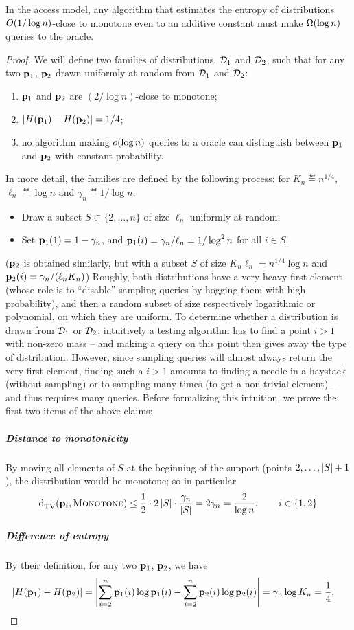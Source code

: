 \begin{theorem}\label{theorem:entropy:estimation:additive:monotone:lb:pdf}
In the \pdfsamp access model, any algorithm that estimates the entropy of distributions $\bigO{1/\log n}$-close to monotone even to an additive constant must make $\bigOmega{\log n}$ queries to the oracle.
\end{theorem}
\begin{proof}
We will define two families of distributions, $\mathcal{D}_1$ and $\mathcal{D}_2$, such that for any two $\mathbf{p}_1$, $\mathbf{p}_2$ drawn uniformly at random from $\mathcal{D}_1$ and $\mathcal{D}_2$:
\begin{enumerate}
  \item $\mathbf{p}_1$ and $\mathbf{p}_2$ are $(2/\log n)$-close to monotone;
  \item $\left\lvert H(\mathbf{p}_1)-H(\mathbf{p}_2) \right\rvert = 1/4$;
  \item no algorithm making $\littleO{\log n}$ queries to a \pdfsamp oracle can distinguish between $\mathbf{p}_1$ and $\mathbf{p}_2$ with constant probability.
\end{enumerate}
In more detail, the families are defined by the following process: for $K_n\eqdef n^{1/4}$, $\ell_n\eqdef\log n$ and $\gamma_n\eqdef 1/\log n$,
\begin{itemize}
  \item Draw a subset $S\subset\{2,\dots,n\}$ of size $\ell_n$ uniformly at random;
  \item Set $\mathbf{p}_1(1)=1-\gamma_n$, and $\mathbf{p}_1(i)=\gamma_n/\ell_n=1/\log^2 n$ for all $i\in S$.
\end{itemize}
($\mathbf{p}_2$ is obtained similarly, but with a subset $S$ of size $K_n\ell_n= n^{1/4}\log n$ and $\mathbf{p}_2(i)=\gamma_n/(\ell_n K_n)$)
Roughly, both distributions have a very heavy first element (whose role is to ``disable'' sampling queries by hogging them with high probability), and then a random subset of size respectively logarithmic or polynomial, on which they are uniform. To determine whether a distribution is drawn from $\mathcal{D}_1$ or $\mathcal{D}_2$, intuitively a testing algorithm has to find a point $i > 1$ with non-zero mass -- and making a query on this point then gives away the type of distribution. However, since sampling queries will almost always return the very first element, finding such a $i > 1$ amounts to finding a needle in a haystack (without sampling) or to sampling many times (to get a non-trivial element) -- and thus requires many queries. Before formalizing this intuition, we prove the first two items of the above claims:
\subparagraph{Distance to monotonicity} By moving all elements of $S$ at the beginning of the support (points $2,\dots,\left\lvert S \right\rvert+1$), the distribution would be monotone; so in particular
\[
  {\operatorname{d}_{\textrm{TV}}^{}\!\left({\mathbf{p}_i, \textsc{Monotone}}\right)}\textit{} \leq \frac{1}{2}\cdot 2\left\lvert S \right\rvert\cdot\frac{\gamma_n}{\left\lvert S \right\rvert}=2\gamma_n = \frac{2}{\log n}, \qquad i\in\{1,2\}
\]
\subparagraph{Difference of entropy} By their definition, for any two $\mathbf{p}_1$, $\mathbf{p}_2$, we have
\begin{align*}
\left\lvert H(\mathbf{p}_1)-H(\mathbf{p}_2) \right\rvert &= \left\lvert  \sum_{i = 2}^n \mathbf{p}_1(i)\log \mathbf{p}_1(i) - \sum_{i = 2}^n \mathbf{p}_2(i)\log \mathbf{p}_2(i)   \right\rvert 
= \gamma_n \log K_n = \frac{1}{4}.
\end{align*}


\end{proof}

